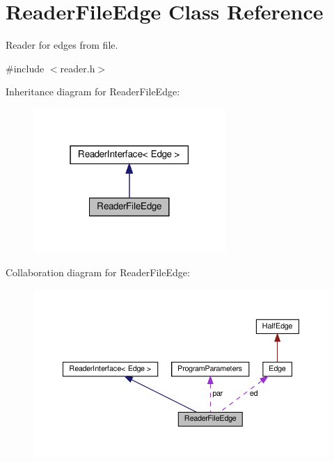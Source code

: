 \hypertarget{classReaderFileEdge}{}\section{Reader\+File\+Edge Class Reference}
\label{classReaderFileEdge}


Reader for edges from file.  




{\ttfamily \#include $<$reader.\+h$>$}



Inheritance diagram for Reader\+File\+Edge\+:
\nopagebreak
\begin{figure}[H]
\begin{center}
\leavevmode
\includegraphics[width=207pt]{classReaderFileEdge__inherit__graph}
\end{center}
\end{figure}


Collaboration diagram for Reader\+File\+Edge\+:
\nopagebreak
\begin{figure}[H]
\begin{center}
\leavevmode
\includegraphics[width=350pt]{classReaderFileEdge__coll__graph}
\end{center}
\end{figure}
